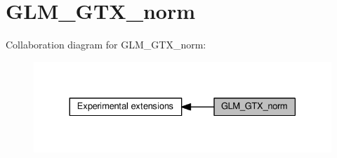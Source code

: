 \hypertarget{group__gtx__norm}{}\section{G\+L\+M\+\_\+\+G\+T\+X\+\_\+norm}
\label{group__gtx__norm}
Collaboration diagram for G\+L\+M\+\_\+\+G\+T\+X\+\_\+norm\+:
\nopagebreak
\begin{figure}[H]
\begin{center}
\leavevmode
\includegraphics[width=330pt]{db/db7/group__gtx__norm}
\end{center}
\end{figure}
